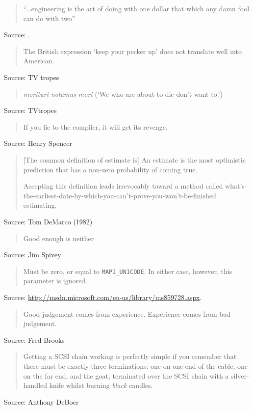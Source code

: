 \documentclass[a4paper]{article}
\begin{document}
\begin{quote}
	``\ldots engineering is the art of doing with one dollar that which
	any damn fool can do with two''
\end{quote}
Source: \citet[p.~xv]{Harland2005}.
\medskip

\begin{quote}
	The British expression `keep your pecker up' does not translate well
	into American.
\end{quote}
Source: TV tropes
\medskip

\begin{quote}
	{\it morituri nolumus mori} (`We who are about to die don't want to.')
\end{quote}
Source: TVtropes
\medskip

\begin{quote}
	If you lie to the compiler, it will get its revenge.
\end{quote}
Source: Henry Spencer
\medskip

\begin{quote}
	[The common definition of estimate is] An estimate is the most
	optimistic prediction that has a non-zero probability of coming
	true.

    Accepting this definition leads irrevocably toward a method
	called
	what's-the-earliest-date-by-which-you-can't-prove-you-won't-be-finished
	estimating.
\end{quote}
Source: Tom DeMarco (1982)
\medskip

\begin{quote}
	Good enough is neither
\end{quote}
Source: Jim Spivey
\medskip

\begin{quote}
	Must be zero, or equal to \verb,MAPI_UNICODE,. In either case,
	however, this parameter is ignored.
\end{quote}
Source: \url{http://msdn.microsoft.com/en-us/library/ms859728.aspx}.
\medskip

\begin{quote}
	Good judgement comes from experience.  Experience comes from
	bad judgement.
\end{quote}
Source: Fred Brooks
\medskip

\begin{quote}
	Getting a SCSI chain working is perfectly simple if you
	remember that there must be exactly three terminations: one
	on one end of the cable, one on the far end, and the goat,
	terminated over the SCSI chain with a silver-handled knife
	whilst burning \emph{black} candles.
\end{quote}
Source: Anthony DeBoer
\medskip
\end{document}
